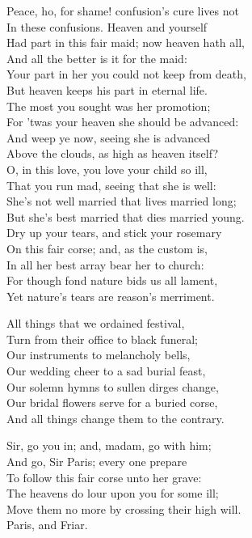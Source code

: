 \begin{speech}
Peace, ho, for shame! confusion's cure lives not
\\
In these confusions. Heaven and yourself \\
Had part in this fair maid; now heaven hath all, \\
And all the better is it for the maid: \\
Your part in her you could not keep from death, \\
But heaven keeps his part in eternal life. \\
The most you sought was her promotion; \\
For 'twas your heaven she should be advanced: \\
And weep ye now, seeing she is advanced \\
Above the clouds, as high as heaven itself? \\
O, in this love, you love your child so ill, \\
That you run mad, seeing that she is well: \\
She's not well married that lives married long; \\
But she's best married that dies married young. \\
Dry up your tears, and stick your rosemary \\
On this fair corse; and, as the custom is, \\
In all her best array bear her to church: \\
For though fond nature bids us all lament, \\
Yet nature's tears are reason's merriment. \\
\end{speech}
\begin{speech}
All things that we ordained festival, \\
Turn from their office to black funeral; \\
Our instruments to melancholy bells, \\
Our wedding cheer to a sad burial feast, \\
Our solemn hymns to sullen dirges change, \\
Our bridal flowers serve for a buried corse, \\
And all things change them to the contrary. \\
\end{speech}
\begin{speech}
Sir, go you in; and, madam, go with him; \\
And go, Sir Paris; every one prepare \\
To follow this fair corse unto her grave: \\
The heavens do lour upon you for some ill; \\
Move them   no more by crossing their high will.  \\
Paris, and Friar. \\
\end{speech}
